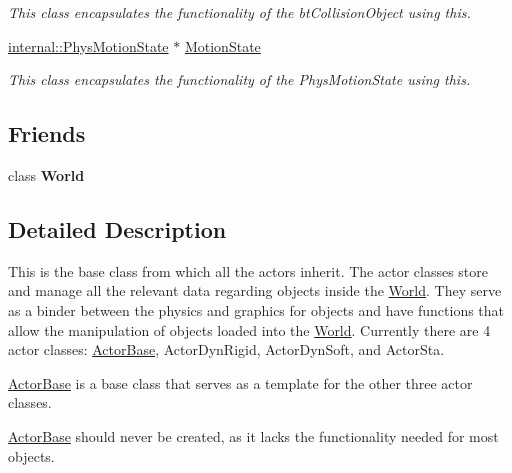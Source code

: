 \begin{DoxyCompactItemize}
\begin{DoxyCompactList}\small\item\em This class encapsulates the functionality of the btCollisionObject using this. \item\end{DoxyCompactList}\item 
\hypertarget{classphys_1_1ActorBase_ab776527aa927b8787313c50530cc24ba}{
\hyperlink{classphys_1_1internal_1_1PhysMotionState}{internal::PhysMotionState} $\ast$ \hyperlink{classphys_1_1ActorBase_ab776527aa927b8787313c50530cc24ba}{MotionState}}
\label{d8/d0f/classphys_1_1ActorBase_ab776527aa927b8787313c50530cc24ba}

\begin{DoxyCompactList}\small\item\em This class encapsulates the functionality of the PhysMotionState using this. \item\end{DoxyCompactList}\end{DoxyCompactItemize}
\subsection*{Friends}
\begin{DoxyCompactItemize}
\item 
\hypertarget{classphys_1_1ActorBase_a7b4bcdf992c21ae83363f25df05b1d25}{
class {\bfseries World}}
\label{d8/d0f/classphys_1_1ActorBase_a7b4bcdf992c21ae83363f25df05b1d25}

\end{DoxyCompactItemize}


\subsection{Detailed Description}
This is the base class from which all the actors inherit. The actor classes store and manage all the relevant data regarding objects inside the \hyperlink{classphys_1_1World}{World}. They serve as a binder between the physics and graphics for objects and have functions that allow the manipulation of objects loaded into the \hyperlink{classphys_1_1World}{World}. Currently there are 4 actor classes: \hyperlink{classphys_1_1ActorBase}{ActorBase}, ActorDynRigid, ActorDynSoft, and ActorSta. \par
 \hyperlink{classphys_1_1ActorBase}{ActorBase} is a base class that serves as a template for the other three actor classes. \par
 \hyperlink{classphys_1_1ActorBase}{ActorBase} should never be created, as it lacks the functionality needed for most objects. 

